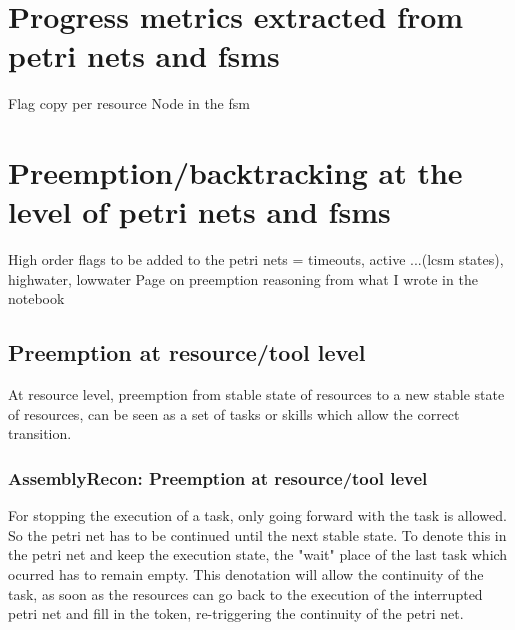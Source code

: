\documentclass[a4paper,10pt]{article}
\begin{document}



\section{Progress metrics extracted from petri nets and fsms}

Flag copy per resource 
Node in the fsm


\section{Preemption/backtracking at the level of petri nets and fsms}

High order flags to be added to the petri nets = timeouts, active ...(lcsm states), highwater, lowwater 
Page on preemption reasoning from what I wrote in the notebook

\subsection{Preemption at resource/tool level}

At resource level, preemption from stable state of resources to a new stable state of resources, can be seen as a set of tasks or skills which allow the correct transition. 

\subsubsection{AssemblyRecon: Preemption at resource/tool level}

For stopping the execution of a task, only going forward with the task is allowed. So the petri net has to be continued until the next stable state. To denote this in the petri net and keep the execution state, the "wait" place of the last task which ocurred has to remain empty. This denotation will allow the continuity of the task, as soon as the resources can go back to the execution of the interrupted petri net and fill in the token, re-triggering the continuity of the petri net.

\end{document}
